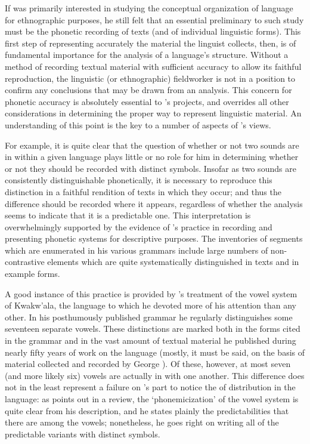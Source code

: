 If {\Boas} was primarily interested in studying the conceptual
organization of language for ethnographic purposes, he still felt that
an essential preliminary to such study must be the phonetic recording
of texts (and of individual linguistic forms). This first step of
representing accurately the material the linguist collects, then, is
of fundamental importance for the analysis of a language's
structure. Without a method of recording textual material with
sufficient accuracy to allow its faithful reproduction, the linguistic
(or ethnographic) fieldworker is not in a position to confirm any
conclusions that may be drawn from an analysis. This concern for
phonetic accuracy is absolutely essential to {\Boas}'s projects, and
overrides all other considerations in determining the proper way to
represent linguistic material. An understanding of this point is the
key to a number of aspects of {\Boas}'s views.

For example, it is quite clear that the question of whether or not two
sounds are in  within a given language plays little or no role
for him in determining whether or not they should be recorded with
distinct symbols. Insofar as two sounds are consistently
distinguishable phonetically, it is necessary to reproduce this
distinction in a faithful rendition of texts in which they occur; and
thus the difference should be recorded where it appears, regardless of
whether the analysis seems to indicate that it is a predictable
one. This interpretation is overwhelmingly supported by the evidence
of {\Boas}'s practice in recording and presenting phonetic systems for
descriptive purposes. The inventories of segments which are enumerated
in his various grammars include large numbers of non-contrastive
elements which are quite systematically distinguished in texts and in
example forms.

A good instance of this practice is provided by {\Boas}'s treatment of
the vowel system of Kwakw'ala, the language to which he devoted more
of his attention than any other. In his posthumously published grammar
\citep{boas47:kwakiutl} he regularly distinguishes some seventeen
separate vowels. These distinctions are marked both in the forms cited
in the grammar and in the vast amount of textual material he published
during nearly fifty years of work on the language (mostly, it must be
said, on the basis of material collected and recorded by George
{\Hunt}). Of these, however, at most seven (and more likely six) vowels
are actually in  with one another. This difference does not in
the least represent a failure on {\Boas}'s part to notice the
 of distribution in the language: as
\citet{swadesh48:rvw.boas} points out in a review, the
`phonemicization' of the vowel system is quite clear from his
description, and he states plainly the predictabilities that there are
among the vowels; nonetheless, he goes right on writing all of the
predictable variants with distinct symbols.

